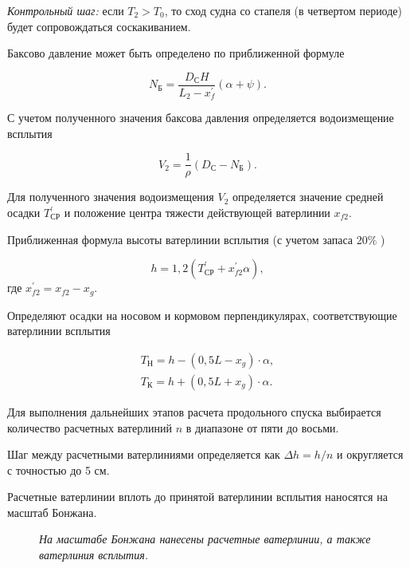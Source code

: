 \textit{Контрольный шаг:} если $T_2 > T_0$, то сход судна со стапеля (в четвертом периоде) будет сопровождаться соскакиванием.

Баксово давление может быть определено по приближенной формуле

\begin{equation}
    N_{\text{Б}} = \frac{D_{\text{С}} H} {L_2 - x_f^\prime} (\alpha + \psi).
\end{equation}

С учетом полученного значения баксова давления определяется водоизмещение всплытия

\begin{equation}
    V_2 = \frac{1}{\rho} (D_{\text{С}} - N_{\text{Б}}).
\end{equation}

Для полученного значения водоизмещения $V_2$ определяется значение средней осадки $T_{\text{СР}}^\prime$ и положение центра тяжести действующей ватерлинии $x_{f2}$.

Приближенная формула высоты ватерлинии всплытия (с учетом запаса 20\% )

\begin{equation}
    h = 1{,}2 (T_{\text{СР}}^\prime + x_{f2}^\prime \alpha),
\end{equation}
где
$x_{f2}^\prime = x_{f2} - x_g$.

Определяют осадки на носовом и кормовом перпендикулярах, соответствующие ватерлинии всплытия

\begin{equation}
    \begin{split}
        T_{\text{Н}} = h - (0,5 L - x_g) \cdot \alpha, \\
        T_{\text{К}}  = h + (0,5 L + x_g) \cdot \alpha.
    \end{split}
\end{equation}

Для выполнения дальнейших этапов расчета продольного спуска выбирается количество расчетных ватерлиний $n$ в диапазоне от пяти до восьми.

Шаг между расчетными ватерлиниями определяется как $\Delta h = h / n$ и округляется с точностью до 5 см.

Расчетные ватерлинии вплоть до принятой ватерлинии всплытия наносятся на масштаб Бонжана.

\begin{figure}[h!]
    \centerline{}
    \caption{Масштаб Бонжана с нанесенными расчетными ватерлиниями}
    \caption*{\textit{На масштабе Бонжана нанесены расчетные ватерлинии, а также ватерлиния всплытия.}}
    \label{fig:bonjan-scale}
\end{figure}

